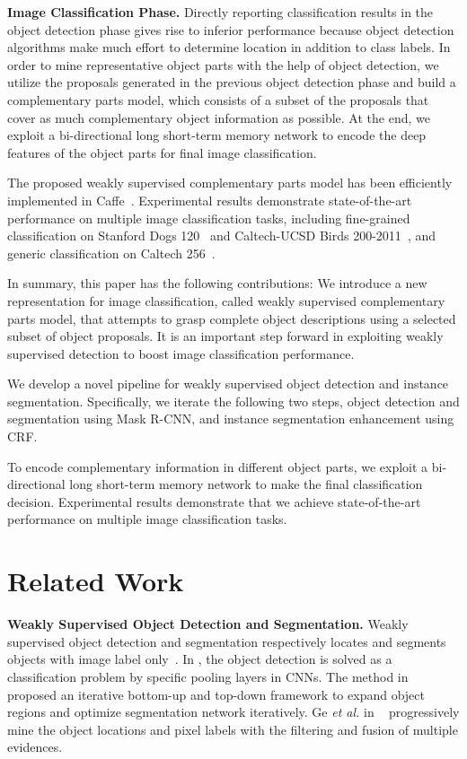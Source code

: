 \documentclass[10pt,twocolumn,letterpaper]{article}
\begin{document}
\noindent\textbf{Image Classification Phase.} Directly reporting classification results in the object detection phase gives rise to inferior performance because object detection algorithms make much effort to determine location in addition to class labels. In order to mine representative object parts with the help of object detection, we utilize the proposals generated in the previous object detection phase and build a complementary parts model, which consists of a subset of the proposals that cover as much complementary object information as possible. At the end, we exploit a bi-directional long short-term memory network to encode the deep features of the object parts for final image classification.

The proposed weakly supervised complementary parts model has been efficiently implemented in Caffe~\cite{jia2014caffe}. Experimental results demonstrate state-of-the-art performance on multiple image classification tasks, including fine-grained classification on Stanford Dogs 120~\cite{KhoslaYaoJayadevaprakashFeiFei_FGVC2011} and Caltech-UCSD Birds 200-2011~\cite{WelinderEtal2010}, and generic classification on Caltech 256~\cite{griffin2007caltech}.


In summary, this paper has the following contributions:
{\flushleft } We introduce a new representation for image classification, called weakly supervised complementary parts model, that attempts to grasp complete object descriptions using a selected subset of object proposals. It is an important step forward in exploiting weakly supervised detection to boost image classification performance.

{\flushleft } We develop a novel pipeline for weakly supervised object detection and instance segmentation. Specifically, we iterate the following two steps, object detection and segmentation using Mask R-CNN, and instance segmentation enhancement using CRF.

{\flushleft } To encode complementary information in different object parts, we exploit a bi-directional long short-term memory network to make the final classification decision. Experimental results demonstrate that we achieve state-of-the-art performance on multiple image classification tasks.
\section{Related Work}
\noindent\textbf{Weakly Supervised Object Detection and Segmentation.} Weakly supervised object detection and segmentation respectively locates and segments objects with image label only~\cite{diba2016weakly}. In \cite{durand2016weldon,durand2017wildcat}, the object detection is solved as a classification problem by specific pooling layers in CNNs.  The method in \cite{Wang_2018_CVPR} proposed an iterative bottom-up and top-down framework to expand object regions and optimize segmentation network iteratively. Ge {\em et al.} in ~\cite{Ge_2018_CVPR} progressively mine the object locations and pixel labels with the filtering and fusion of multiple evidences.
\end{document}
